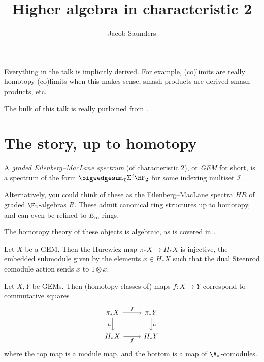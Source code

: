 \documentclass{article}
\title{Higher algebra in characteristic 2}
\author{Jacob Saunders}
\begin{document}
\maketitle

Everything in the talk is implicitly derived.
For example, (co)limits are really homotopy (co)limits when this makes sense, smash products are derived smash products, etc.

The bulk of this talk is really purloined from \cite{szymik}.

\section{The story, up to homotopy}

\begin{definition}
    A \textit{graded Eilenberg--MacLane spectrum} (of characteristic 2), or \textit{GEM} for short, is a spectrum of the form $\bigwedgesum_{\mathcal{I}} \Sigma^i \HF_2$ for some indexing multiset $\mathcal{I}$.
\end{definition}

Alternatively, you could think of these as the Eilenberg--MacLane spectra $HR$ of graded $\F_2$-algebras $R$.
These admit canonical ring structures up to homotopy, and can even be refined to $E_\infty$ rings.

The homotopy theory of these objects is algebraic, as is covered in \cite{boardman}.

\begin{lemma}
    Let $X$ be a GEM.
    Then the Hurewicz map $\pi_* X \to H_* X$ is injective, the embedded submodule given by the elements $x \in H_* X$ such that the dual Steenrod comodule action sends $x$ to $1 \otimes x$.
\end{lemma}

\begin{lemma}
    Let $X, Y$ be GEMs.
    Then (homotopy classes of) maps $f : X \to Y$ correspond to commutative squares
    \[\begin{tikzcd}
        {\pi_* X} & {\pi_* Y} \\
        {H_* X} & {H_* Y}
        \arrow["f", from=1-1, to=1-2]
        \arrow["h"', from=1-1, to=2-1]
        \arrow["h", from=1-2, to=2-2]
        \arrow["f"', from=2-1, to=2-2]
    \end{tikzcd}\]
    where the top map is a module map, and the bottom is a map of $\A_*$-comodules.
\end{lemma}
\end{document}

